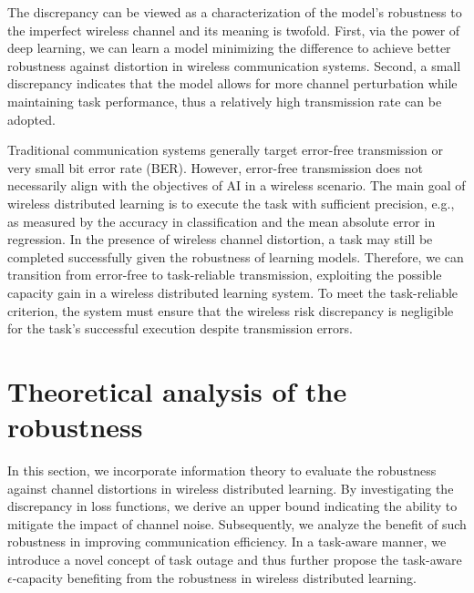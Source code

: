\documentclass[lettersize,journal]{IEEEtran}
\theoremstyle{definition}
\theoremstyle{plain}
\begin{document}
The discrepancy can be viewed as a characterization of the model's robustness to the imperfect wireless channel and its meaning is twofold.
First, via the power of deep learning, we can learn a model minimizing the difference to achieve better robustness against distortion in wireless communication systems. 
Second, a small discrepancy indicates that the model allows for more channel perturbation while maintaining task performance, thus a relatively high transmission rate can be adopted. 

Traditional communication systems generally target error-free transmission or very small bit error rate (BER). 
However, error-free transmission does not necessarily align with the objectives of AI in a wireless scenario.
The main goal of wireless distributed learning is to execute the task with sufficient precision, e.g., as measured by the accuracy in classification and the mean absolute error in regression.
In the presence of wireless channel distortion, a task may still be completed successfully given the robustness of learning models. 
Therefore, we can transition from error-free to task-reliable transmission, exploiting the possible capacity gain in a wireless distributed learning system. 
To meet the task-reliable criterion, the system must ensure that the wireless risk discrepancy is negligible for the task's successful execution despite transmission errors.




\section{Theoretical analysis of the robustness}
\label{sec:main_results}
In this section, we incorporate information theory to evaluate the robustness against channel distortions in wireless distributed learning. By investigating the discrepancy in loss functions, we derive an upper bound indicating the ability to mitigate the impact of channel noise. Subsequently, we analyze the benefit of such robustness in improving communication efficiency. In a task-aware manner, we introduce a novel concept of task outage and thus further propose the task-aware $\epsilon$-capacity benefiting from the robustness in wireless distributed learning. 
\end{document}

